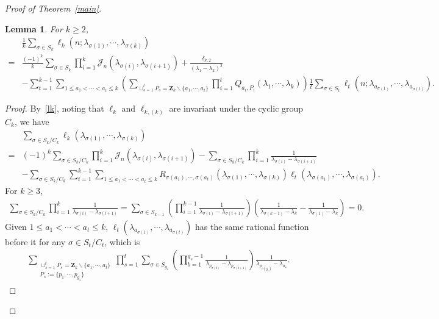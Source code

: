 \documentclass[a4paper]{article}
\theoremstyle{plain}
\newtheorem{lem}{Lemma}
\theoremstyle{definition}
\newcommand{\nn}{\nonumber}
\begin{document}
\begin{proof}[Proof of Theorem~\ref{main}]
\begin{lem}
	For $k\ge2$,
	\begin{align}
		&\frac{1}{k}\sum_{\sigma\in S_k}\ell_k(n;\lambda_{\sigma(1)},\cdots,\lambda_{\sigma(k)})\nn\\
		=&\frac{(-1)^k}{k}\sum_{\sigma\in S_k}\prod_{i=1}^k\mathcal J_n(\lambda_{\sigma(i)},\lambda_{\sigma(i+1)})+\frac{\delta_{k,2}}{(\lambda_1-\lambda_2)^2}\nn\\
		&-\sum_{t=1}^{k-1}\sum_{1\le a_1<\cdots<a_t\le k}\left(\sum_{\sqcup_{s=1}^tP_s=\mathbf Z_k\backslash\{a_1,\cdots,a_t\}}\prod_{i=1}^tQ_{a_i,P_i}(\lambda_1,\cdots,\lambda_k)\right)\frac{1}{t}\sum_{\sigma\in S_t}\ell_t(n;\lambda_{a_{\sigma(1)}},\cdots,\lambda_{a_{\sigma(t)}}). \label{cor-L}
	\end{align}
\end{lem}
\begin{proof}
	By~\eqref{lk}, noting that $\ell_{k}$ and $\ell_{k,(k)}$ are invariant under the cyclic group $C_{k}$, we have
	\begin{align}
		&\sum_{\sigma\in S_k/C_k}\ell_k(\lambda_{\sigma(1)},\cdots,\lambda_{\sigma(k)})\nn\\
		=&(-1)^k\sum_{\sigma\in S_k/C_k}\prod_{i=1}^k\mathcal J_n(\lambda_{\sigma(i)},\lambda_{\sigma(i+1)})-\sum_{\sigma\in S_k/C_k}\prod_{i=1}^k\frac{1}{\lambda_{\sigma(i)}-\lambda_{\sigma(i+1)}} \nn\\
		&-\sum_{\sigma\in S_{k}/C_{k}}\sum_{t=1}^{k-1}\sum_{1\le a_1<\cdots<a_t\le k}R_{\sigma(a_1),\cdots,\sigma(a_t)}(\lambda_{\sigma(1)},\cdots,\lambda_{\sigma(k)})\ell_{t}(\lambda_{\sigma(a_1)},\cdots,\lambda_{\sigma(a_t)}).
	\end{align}
	For $k\ge3$,
	\begin{align}
		\sum_{\sigma\in S_k/C_k}\prod_{i=1}^k\frac{1}{\lambda_{\sigma(i)}-\lambda_{\sigma(i+1)}}=\sum_{\sigma\in S_{k-1}}\left(\prod_{i=1}^{k-1}\frac{1}{\lambda_{\sigma(i)}-\lambda_{\sigma(i+1)}}\right)\left(\frac{1}{\lambda_{\sigma(k-1)}-\lambda_k}-\frac{1}{\lambda_{\sigma(1)}-\lambda_k}\right)=0.
	\end{align}
	Given $1\le a_{1}<\cdots<a_{t}\le k$, $\ell_{t}(\lambda_{a_{\sigma(1)}},\cdots,\lambda_{a_{\sigma(t)}})$ has the same rational function before it for any $\sigma\in S_{t}/C_{t}$, which is
	\begin{align}
		\sum_{\substack{\sqcup_{s=1}^tP_s=\mathbf Z_k\backslash\{a_1,\cdots,a_t\}\\P_s:=\{p_1,\cdots,p_{g_s}\}}}\prod_{s=1}^{t}\sum_{\sigma\in S_{g_s}}\left(\prod_{b=1}^{g_s-1}\frac{1}{\lambda_{p_{\sigma(b)}}-\lambda_{p_{\sigma(b+1)}}}\right)\frac{1}{\lambda_{p_{\sigma(g_s)}}-\lambda_{a_s}}.

\end{align}
\end{proof}
\end{proof}
\end{document}
